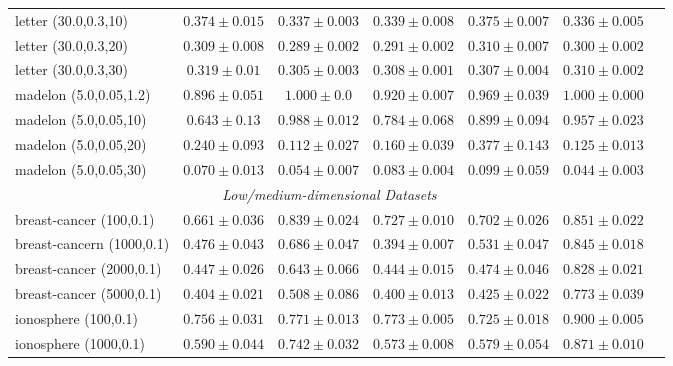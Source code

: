 \begin{footnotesize}
\begin{table}[p!]
\begin{tabular}{lcccccc}
letter (30.0,0.3,10)  & $0.374 \pm 0.015$ &  $0.337 \pm 0.003$ &  $0.339 \pm 0.008$ &  $0.375 \pm 0.007$ & $0.336 \pm  0.005$   \\
letter (30.0,0.3,20)  & $0.309 \pm 0.008$ &  $0.289 \pm 0.002$ &  $0.291 \pm 0.002$ &  $0.310 \pm 0.007$ & $0.300 \pm  0.002$   \\
letter (30.0,0.3,30)  & $0.319 \pm 0.01$  &  $0.305 \pm 0.003$ &  $0.308 \pm 0.001$ &  $0.307 \pm 0.004$ & $0.310 \pm  0.002$   \\
\midrule
madelon (5.0,0.05,1.2)& $0.896 \pm 0.051$ &  $1.000 \pm 0.0$   &  $0.920 \pm 0.007$ &  $0.969 \pm 0.039$ & $1.000 \pm  0.000$   \\
madelon (5.0,0.05,10) & $0.643 \pm 0.13$  &  $0.988 \pm 0.012$ &  $0.784 \pm 0.068$ &  $0.899 \pm 0.094$ & $0.957 \pm  0.023$   \\
madelon (5.0,0.05,20) & $0.240 \pm 0.093$ &  $0.112 \pm 0.027$ &  $0.160 \pm 0.039$ &  $0.377 \pm 0.143$ & $0.125 \pm  0.013$  \\
madelon (5.0,0.05,30) & $0.070 \pm 0.013$ &  $0.054 \pm 0.007$ &  $0.083 \pm 0.004$ &  $0.099 \pm 0.059$ & $0.044 \pm  0.003$   \\
\midrule
\multicolumn{6}{c}{\textit{Low/medium-dimensional Datasets}}\\
breast-cancer (100,0.1)   & $0.661 \pm 0.036$ &  $0.839 \pm 0.024$ &  $0.727 \pm 0.010$ &  $0.702 \pm 0.026$ & $0.851 \pm  0.022$ \\
breast-cancern (1000,0.1) & $0.476 \pm 0.043$ &  $0.686 \pm 0.047$ &  $0.394 \pm 0.007$ &  $0.531 \pm 0.047$ & $0.845 \pm  0.018$ \\
breast-cancer (2000,0.1)  & $0.447 \pm 0.026$ &  $0.643 \pm 0.066$ &  $0.444 \pm 0.015$ &  $0.474 \pm 0.046$ & $0.828 \pm  0.021$ \\
breast-cancer (5000,0.1)  & $0.404 \pm 0.021$ &  $0.508 \pm 0.086$ &  $0.400 \pm 0.013$ &  $0.425 \pm 0.022$ & $0.773 \pm  0.039$ \\
\midrule
ionosphere (100,0.1)      & $0.756 \pm 0.031$ &  $0.771 \pm 0.013$ &  $0.773 \pm 0.005$ &  $0.725 \pm 0.018$ & $0.900 \pm  0.005$ \\
ionosphere (1000,0.1)     & $0.590 \pm 0.044$ &  $0.742 \pm 0.032$ &  $0.573 \pm 0.008$ &  $0.579 \pm 0.054$ & $0.871 \pm  0.010$ \\

\end{tabular}
\end{table}
\end{footnotesize}

